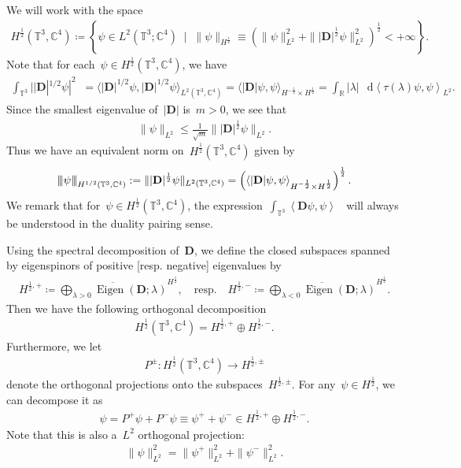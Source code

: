 \documentclass[11pt,final]{amsart}
\newcommand{\tnorm}[1]{%
  \left\vert\kern-0.3ex\left\vert\kern-0.3ex\left\vert #1 \right\vert\kern-0.3ex\right\vert\kern-0.3ex\right\vert
}
\newcommand{\Abracket}[1]{\left<#1\right>} %
\newcommand{\parenthesis}[1]{\left(#1\right)} %
\newcommand{\braces}[1]{\left\{#1\right\}} %
\newcommand{\C}{\mathbb{C}}
\newcommand{\T}{\mathbb{T}}
\newcommand{\dd}{\mathop{}\!\mathrm{d}}
\newcommand{\pD}{\mathbf{D}}
\DeclareMathOperator{\dv}{\dd{vol}}
\DeclareMathOperator{\Eigen}{Eigen}
\begin{document}
We will work with the space
\begin{align}
    H^{\frac{1}{2}}(\T^3, \mathbb{C}^4)
    \coloneqq \braces{ \psi\in L^2(\T^3;\C^4)\;\mid \; \|\psi\|_{H^{\frac{1}{2}}} \equiv \parenthesis{\|\psi\|_{L^2}^2 + \||\pD|^{\frac{1}{2}}\psi\|_{L^2}^2}^{\frac{1}{2}} <+\infty }.
\end{align}
Note that for each~$\psi\in  H^{\frac12}(\T^3, \mathbb{C}^4)$, we have
  \begin{align}
      \int_{\mathbb{T}^3} ||\pD|^{1/2}\psi|^2 \dv 
      = \langle |\pD|^{1/2}\psi, |\pD|^{1/2}\psi \rangle_{L^2(\T^3, \mathbb{C}^4)}
      = \langle |\pD|\psi, \psi \rangle_{H^{-\frac{1}{2}}\times H^{\frac{1}{2}}} 
      = \int_{\mathbb{R}} |\lambda| \,\dd\Abracket{\tau(\lambda)\psi,\psi}_{L^2} .
  \end{align}
Since the smallest eigenvalue of~$|\pD|$ is~$m>0$, we see that 
\begin{align}
    \|\psi\|_{L^2} \leq \frac{1}{\sqrt{m}}\| |\pD|^{\frac{1}{2}} \psi\|_{L^2}. 
\end{align}
Thus we have an equivalent norm on~$H^{\frac{1}{2}}(\T^3,\C^4)$ given by 
\begin{align}\label{eq:equiv norm}
    \tnorm{\psi}_{H^{1/2}(\T^3,\C^4)}:= \| |\pD|^{\frac{1}{2}} \psi\|_{L^2(\mathbb{T}^3,\C^4)}= \parenthesis{ \langle |\pD|\psi, \psi \rangle_{H^{-\frac{1}{2}}\times H^{\frac{1}{2}}} }^{\frac{1}{2}}.
\end{align}
We remark that for~$\psi\in H^{\frac{1}{2}}(\T^3,\C^4)$, the expression~$\int_{\T^3}\Abracket{\pD\psi,\psi}\dv$ will always be understood in the duality pairing sense.

Using the spectral decomposition of~$\pD$, we define the closed subspaces spanned by eigenspinors of positive [resp. negative] eigenvalues by
\begin{align}
    H^{\frac{1}{2},+}\coloneqq
    \overline{\bigoplus_{\lambda>0} \Eigen(\pD; \lambda)}^{H^{\frac{1}{2}}},
    \quad \mbox{resp.}
    \quad
    H^{\frac{1}{2},-}\coloneqq
    \overline{\bigoplus_{\lambda<0} \Eigen(\pD; \lambda)}^{H^{\frac{1}{2}}}.
\end{align}
Then we have the following orthogonal decomposition
\begin{align}
    H^{\frac{1}{2}}(\mathbb{T}^3, \mathbb{C}^4)
    =H^{\frac{1}{2},+}\oplus H^{\frac{1}{2},-}.
\end{align}
Furthermore, we let
\begin{align}
    P^{\pm} \colon H^{\frac{1}{2}}(\mathbb{T}^3,\C^4) \to H^{\frac{1}{2},\pm}
\end{align}
denote the orthogonal projections onto the subspaces~$H^{\frac{1}{2},\pm}$.
For any~$\psi\in H^{\frac{1}{2}}$, we can decompose it as
\begin{align}
    \psi = P^+\psi + P^-\psi \equiv \psi^+ + \psi^- \in H^{\frac{1}{2},+}\oplus H^{\frac{1}{2},-}.
\end{align}
Note that this is also a~$L^2$ orthogonal projection:
\begin{align}
    \|\psi\|_{L^2}^2 = \|\psi^+\|_{L^2}^2 + \|\psi^-\|_{L^2}^2.
\end{align}
\end{document}
